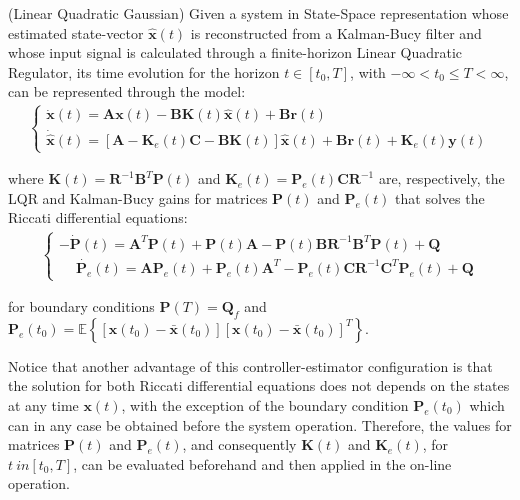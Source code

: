 \documentclass[a4paper,11pt]{book}
\numberwithin{figure}{chapter}
\numberwithin{equation}{chapter}
\numberwithin{table}{chapter}
\theoremstyle{definition}
\newtheorem{definition}{Definition}[chapter]
\newcounter{boxed-theorem}
\newcounter{boxed-definition}
\newenvironment{boxed-definition}[1]
{\begin{shaded} \begin{definition}{#1}}
{\end{definition} \end{shaded}}
\begin{document}
\begin{boxed-definition}{(Linear Quadratic Gaussian)} \label{def:lqg}
	Given a system in State-Space representation whose estimated state-vector $\hat{\bm{x}}(t)$ is reconstructed from a Kalman-Bucy filter and whose input signal is calculated through a finite-horizon Linear Quadratic Regulator, its time evolution for the horizon $t \in [t_0, T]$, with $-\infty < t_0 \leq T < \infty$, can be represented through the model:
	\begin{align} \label{eq:lqg01}
	\begin{cases}
		\dot{\bm{x}}(t) = \bm{A} \bm{x}(t) - \bm{B} \bm{K}(t) \hat{\bm{x}}(t) + \bm{B} \bm{r}(t) \\
		\dot{\hat{\bm{x}}}(t) = \left[\bm{A} - \bm{K}_e(t) \bm{C} - \bm{B} \bm{K}(t) \right] \hat{\bm{x}}(t) + \bm{B} \bm{r}(t) + \bm{K}_e(t) \bm{y}(t) 
	\end{cases}
	\end{align}
	
	\noindent where $\bm{K}(t) = \bm{R}^{-1}\bm{B}^T \bm{P}(t)$ and $\bm{K}_e(t) = \bm{P}_e(t) \bm{C} \bm{R}^{-1}$ are, respectively, the LQR and Kalman-Bucy gains for matrices $\bm{P}(t)$ and $\bm{P}_e(t)$ that solves the Riccati differential equations:
	\begin{align}
	\begin{cases}
		-\dot{\bm{P}}(t) = \bm{A}^T \bm{P}(t) + \bm{P}(t) \bm{A} - \bm{P}(t) \bm{B} \bm{R}^{-1} \bm{B}^T \bm{P}(t) + \bm{Q} \\
		\phantom{-} \dot{\bm{P}_e}(t) = \bm{A} \bm{P}_e(t) + \bm{P}_e(t) \bm{A}^T - \bm{P}_e(t)\bm{C}\bm{R}^{-1} \bm{C}^T \bm{P}_e(t) + \bm{Q}
	\end{cases}
	\end{align}
	
	\noindent for boundary conditions $\bm{P}(T) = \bm{Q}_f$ and $\bm{P}_e(t_0) = \mathbb{E} \left\{ [\bm{x}(t_0) - \bar{\bm{x}}(t_0)][\bm{x}(t_0) - \bar{\bm{x}}(t_0)]^T \right\}$.
\end{boxed-definition}

Notice that another advantage of this controller-estimator configuration is that the solution for both Riccati differential equations does not depends on the states at any time $\bm{x}(t)$, with the exception of the boundary condition $\bm{P}_e(t_0)$ which can in any case be obtained before the system operation. Therefore, the values for matrices $\bm{P}(t)$ and $\bm{P}_e(t)$, and consequently $\bm{K}(t)$ and $\bm{K}_e(t)$, for $t \ in [t_0, T]$, can be evaluated beforehand and then applied in the on-line operation.
\end{document}
